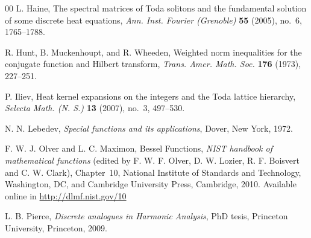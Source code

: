 \documentclass[11pt]{amsart}
\numberwithin{equation}{section}
\newcommand{\Z}{\mathbb{Z}}
\theoremstyle{plain}
\theoremstyle{remark}
\begin{document}
\begin{thebibliography}{00}
L. Haine,
The spectral matrices of Toda solitons and the fundamental solution of some discrete heat equations,
\textit{Ann. Inst. Fourier (Grenoble)} \textbf{55} (2005), no.~6, 1765--1788.

R. Hunt, B. Muckenhoupt, and R. Wheeden,
Weighted norm inequalities for the conjugate function and Hilbert transform,
\textit{Trans. Amer. Math. Soc.} \textbf{176} (1973), 227--251.

P. Iliev,
Heat kernel expansions on the integers and the Toda lattice hierarchy,
\textit{Selecta Math. (N. S.)} \textbf{13} (2007), no.~3, 497--530.

%
%

N. N. Lebedev,
\textit{Special functions and its applications},
Dover, New York, 1972.

%
%

F. W. J. Olver and L. C. Maximon,
Bessel Functions,
\textit{NIST handbook of mathematical functions}
(edited by F. W. F. Olver, D. W. Lozier, R. F. Boisvert and C. W. Clark),
Chapter~10, National Institute of Standards and Technology, Washington, DC,
and Cambridge University Press, Cambridge, 2010.
Available online in \url{http://dlmf.nist.gov/10}

L. B. Pierce,
\textit{Discrete analogues in Harmonic Analysis},
PhD tesis, Princeton University, Princeton, 2009.

%


\end{thebibliography}
\end{document}
